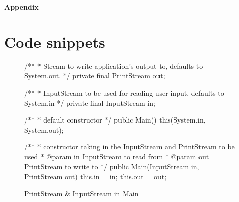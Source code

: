 \appendix
\setcounter{section}{0}
\pagebreak 
\clearpage
\thispagestyle{empty} %
\vspace*{9cm}
\begin{center}
{\bf \LARGE Appendix}
\end{center}
\vfill
\pagebreak







\pagebreak
\section{Code snippets}
\label{app:code-snippets}

\begin{figure}[H]
\centering
\begin{javacode}
/**
 * Stream to write application's output to, defaults to System.out.
 */
private final PrintStream out;

/**
 * InputStream to be used for reading user input, defaults to System.in
 */
private final InputStream in;

/**
 * default constructor
 */
public Main() {
    this(System.in, System.out);
}

/**
 * constructor taking in the InputStream and PrintStream to be used
 * @param in InputStream to read from
 * @param out PrintStream to write to
 */
public Main(InputStream in, PrintStream out) {
    this.in = in;
    this.out = out;
}
\end{javacode}
\caption{PrintStream \& InputStream in Main}
\label{code:snippet-1}
\end{figure}
\pagebreak
